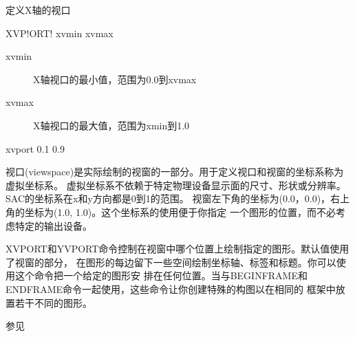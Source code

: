 \label{cmd:xvport}

定义X轴的视口

\begin{SACSTX}
XVP!ORT! xvmin xvmax
\end{SACSTX}

\begin{description}
\item [xvmin] X轴视口的最小值，范围为0.0到xvmax
\item [xvmax] X轴视口的最大值，范围为xmin到1.0
\end{description}

\begin{SACDFT}
xvport 0.1 0.9
\end{SACDFT}

视口(viewspace)是实际绘制的视窗的一部分。用于定义视口和视窗的坐标系称为虚拟坐标系。
虚拟坐标系不依赖于特定物理设备显示面的尺寸、形状或分辨率。SAC的坐标系在x和y方向都是0到1的范围。
视窗左下角的坐标为(0.0，0.0)，右上角的坐标为(1.0, 1.0)。这个坐标系的使用便于你指定
一个图形的位置，而不必考虑特定的输出设备。

XVPORT和YVPORT命令控制在视窗中哪个位置上绘制指定的图形。默认值使用了视窗的部分，
在图形的每边留下一些空间绘制坐标轴、标签和标题。你可以使用这个命令把一个给定的图形安
排在任何位置。当与BEGINFRAME和ENDFRAME命令一起使用，这些命令让你创建特殊的构图以在相同的
框架中放置若干不同的图形。

参见 
